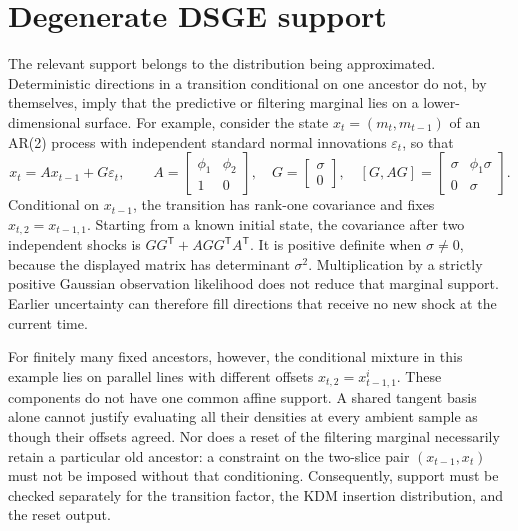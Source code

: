 \documentclass[11pt]{article}
\begin{document}
\section{Degenerate DSGE support}

The relevant support belongs to the distribution being approximated.
Deterministic directions in a transition conditional on one ancestor do not,
by themselves, imply that the predictive or filtering marginal lies on a
lower-dimensional surface.  For example, consider the state
$x_t=(m_t,m_{t-1})$ of an AR(2) process with independent standard normal
innovations $\varepsilon_t$, so that
\begin{equation}
 x_t=A x_{t-1}+G\varepsilon_t,\qquad
 A=\begin{bmatrix}\phi_1&\phi_2\\1&0\end{bmatrix},\quad
 G=\begin{bmatrix}\sigma\\0\end{bmatrix},\quad
 [G,AG]=\begin{bmatrix}\sigma&\phi_1\sigma\\0&\sigma\end{bmatrix}.
 \label{eq:ar2-support-distinction}
\end{equation}
Conditional on $x_{t-1}$, the transition has rank-one covariance and fixes
$x_{t,2}=x_{t-1,1}$.  Starting from a known initial state, the covariance
after two independent shocks is $GG^\mathsf{T}+AGG^\mathsf{T}A^\mathsf{T}$.
It is positive definite when $\sigma\ne0$, because the displayed matrix has
determinant $\sigma^2$.  Multiplication by a strictly positive Gaussian
observation likelihood does not reduce that marginal support.  Earlier
uncertainty can therefore fill directions that receive no new shock at the
current time.

For finitely many fixed ancestors, however, the conditional mixture in this
example lies on parallel lines with different offsets $x_{t,2}=x_{t-1,1}^i$.
These components do not have one common affine support.  A shared tangent
basis alone cannot justify evaluating all their densities at every ambient
sample as though their offsets agreed.  Nor does a reset of the filtering
marginal necessarily retain a particular old ancestor: a constraint on the
two-slice pair $(x_{t-1},x_t)$ must not be imposed without that conditioning.
Consequently, support must be checked separately for the transition factor,
the KDM insertion distribution, and the reset output.
\end{document}
